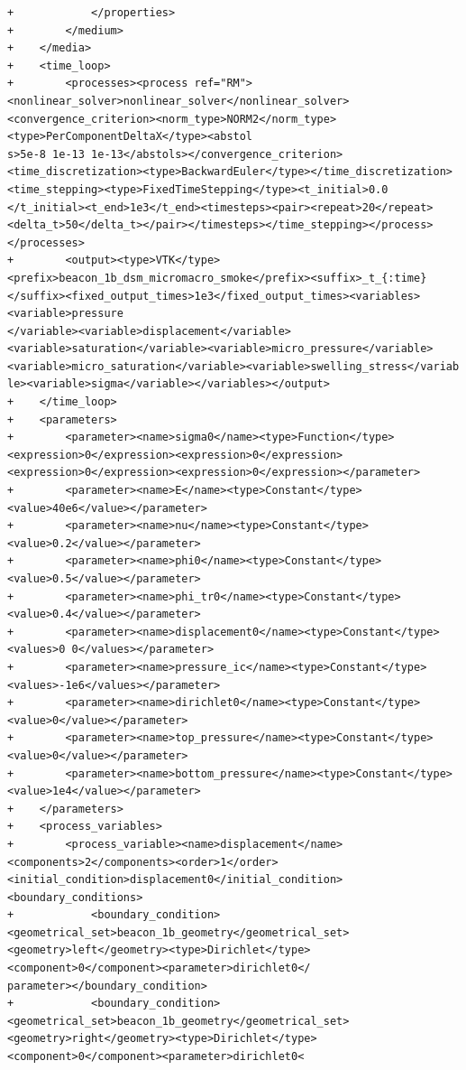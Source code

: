 \documentclass[10pt]{article}
\begin{document}
\begin{lstlisting}
+            </properties>
+        </medium>
+    </media>
+    <time_loop>
+        <processes><process ref="RM"><nonlinear_solver>nonlinear_solver</nonlinear_solver><convergence_criterion><norm_type>NORM2</norm_type><type>PerComponentDeltaX</type><abstol
s>5e-8 1e-13 1e-13</abstols></convergence_criterion><time_discretization><type>BackwardEuler</type></time_discretization><time_stepping><type>FixedTimeStepping</type><t_initial>0.0
</t_initial><t_end>1e3</t_end><timesteps><pair><repeat>20</repeat><delta_t>50</delta_t></pair></timesteps></time_stepping></process></processes>
+        <output><type>VTK</type><prefix>beacon_1b_dsm_micromacro_smoke</prefix><suffix>_t_{:time}</suffix><fixed_output_times>1e3</fixed_output_times><variables><variable>pressure
</variable><variable>displacement</variable><variable>saturation</variable><variable>micro_pressure</variable><variable>micro_saturation</variable><variable>swelling_stress</variab
le><variable>sigma</variable></variables></output>
+    </time_loop>
+    <parameters>
+        <parameter><name>sigma0</name><type>Function</type><expression>0</expression><expression>0</expression><expression>0</expression><expression>0</expression></parameter>
+        <parameter><name>E</name><type>Constant</type><value>40e6</value></parameter>
+        <parameter><name>nu</name><type>Constant</type><value>0.2</value></parameter>
+        <parameter><name>phi0</name><type>Constant</type><value>0.5</value></parameter>
+        <parameter><name>phi_tr0</name><type>Constant</type><value>0.4</value></parameter>
+        <parameter><name>displacement0</name><type>Constant</type><values>0 0</values></parameter>
+        <parameter><name>pressure_ic</name><type>Constant</type><values>-1e6</values></parameter>
+        <parameter><name>dirichlet0</name><type>Constant</type><value>0</value></parameter>
+        <parameter><name>top_pressure</name><type>Constant</type><value>0</value></parameter>
+        <parameter><name>bottom_pressure</name><type>Constant</type><value>1e4</value></parameter>
+    </parameters>
+    <process_variables>
+        <process_variable><name>displacement</name><components>2</components><order>1</order><initial_condition>displacement0</initial_condition><boundary_conditions>
+            <boundary_condition><geometrical_set>beacon_1b_geometry</geometrical_set><geometry>left</geometry><type>Dirichlet</type><component>0</component><parameter>dirichlet0</
parameter></boundary_condition>
+            <boundary_condition><geometrical_set>beacon_1b_geometry</geometrical_set><geometry>right</geometry><type>Dirichlet</type><component>0</component><parameter>dirichlet0<

\end{lstlisting}
\end{document}
